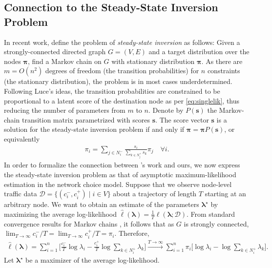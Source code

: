 \subsection{Connection to the Steady-State Inversion Problem}

In recent work, \citet{kumar2015inverting} define the problem of \emph{steady-state inversion} as follows:
Given a strongly-connected directed graph $G = (V, E)$ and a target distribution over the nodes $\bm{\pi}$, find a Markov chain on $G$ with stationary distribution $\bm{\pi}$.
As there are $m = O(n^2)$ degrees of freedom (the transition probabilities) for $n$ constraints (the stationary distribution), the problem is in most cases underdetermined.
Following Luce's ideas, the transition probabilities are constrained to be proportional to a latent score of the destination node as per \eqref{eq:singlelik}, thus reducing the number of parameters from $m$ to $n$.
Denote by $P(\bm{s})$ the Markov-chain transition matrix parametrized with scores $\bm{s}$.
The score vector $\bm{s}$ is a solution for the steady-state inversion problem if and only if $\bm{\pi} = \bm{\pi} P(\bm{s})$, or equivalently
\begin{align}
\label{eq:balance}
\pi_i = \sum_{j \in N^-_i} \frac{s_i}{\sum_{k \in N^+_j} s_k} \pi_j \quad \forall i.
\end{align}
In order to formalize the connection between \citeauthor{kumar2015inverting}'s work and ours, we now express the steady-state inversion problem as that of asymptotic maximum-likelihood estimation in the network choice model.
Suppose that we observe node-level traffic data $\mathcal{D} = \{ (c^-_i, c^+_i) \mid i \in V \}$ about a trajectory of length $T$ starting at an arbitrary node.
We want to obtain an estimate of the parameters $\bm{\lambda}^\star$ by maximizing the average log-likelihood $\hat{\ell}(\bm{\lambda}) = \frac{1}{T} \ell (\bm{\lambda} ; \mathcal{D})$.
From standard convergence results for Markov chains \citep{kemeny1976finite}, it follows that as $G$ is strongly connected, $\lim_{T \to \infty} c^-_i / T = \lim_{T \to \infty} c^+_i / T = \pi_i$.
Therefore,
\begin{align*}
\hat{\ell}(\bm{\lambda})
    = \sum_{i = 1}^n \bigg[ \frac{c^-_i}{T} \log \lambda_i - \frac{c^+_i}{T} \log \sum_{k \in N^+_i} \lambda_k \bigg]
    \xrightarrow{T \to \infty} \sum_{i = 1}^n \pi_i \bigg[ \log \lambda_i - \log \sum_{k \in N^+_i} \lambda_k \bigg].
\end{align*}
Let $\bm{\lambda}^\star$ be a maximizer of the average log-likelihood.

